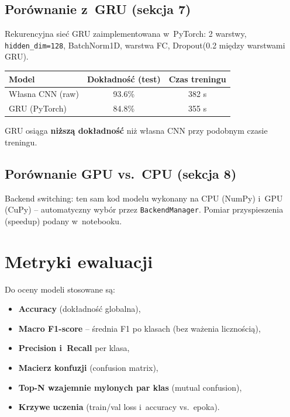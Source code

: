 \documentclass[12pt,a4paper]{article}
\begin{document}
\subsection{Porównanie z~GRU (sekcja 7)}

Rekurencyjna sieć GRU zaimplementowana w~PyTorch: 2 warstwy, \texttt{hidden\_dim=128}, BatchNorm1D, warstwa FC, Dropout(0.2 między warstwami GRU).

\begin{center}
\begin{tabular}{@{}lcc@{}}
\toprule
Model & Dokładność (test) & Czas treningu \\
\midrule
Własna CNN (raw) & 93.6\%   & 382 s \\
GRU (PyTorch)    & 84.8\%   & 355 s \\
\bottomrule
\end{tabular}
\end{center}

GRU osiąga \textbf{niższą dokładność} niż własna CNN przy podobnym czasie treningu.

\subsection{Porównanie GPU vs.\ CPU (sekcja 8)}

Backend switching: ten sam kod modelu wykonany na CPU (NumPy) i~GPU (CuPy) -- automatyczny wybór przez \texttt{BackendManager}. Pomiar przyspieszenia (speedup) podany w~notebooku.

\section{Metryki ewaluacji}

Do oceny modeli stosowane są:
\begin{itemize}
  \item \textbf{Accuracy} (dokładność globalna),
  \item \textbf{Macro F1-score} -- średnia F1 po klasach (bez ważenia licznością),
  \item \textbf{Precision i~Recall} per klasa,
  \item \textbf{Macierz konfuzji} (confusion matrix),
  \item \textbf{Top-N wzajemnie mylonych par klas} (mutual confusion),
  \item \textbf{Krzywe uczenia} (train/val loss i~accuracy vs.\ epoka).
\end{itemize}
\end{document}
